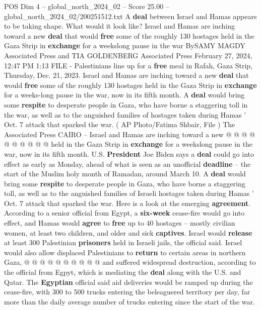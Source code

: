 \begin{textsample}{POS Dim 4 – global\_north\_2024\_02 – Score 25.00 – global\_north\_2024\_02/200251512.txt}  \label{ex:f4_pos_174}
A \textbf{deal} between Israel and Hamas appears to be taking shape.
What would it look like?
Israel and Hamas are inching toward a new \textbf{deal} that would \textbf{free} some of the roughly 130 hostages held in the Gaza Strip in \textbf{exchange} for a weekslong pause in the war BySAMY MAGDY Associated Press and TIA GOLDENBERG Associated Press February 27, 2024, 12:47 PM 1:13 FILE - Palestinians line up for a \textbf{free} meal in Rafah, Gaza Strip, Thursday, Dec. 21, 2023.
Israel and Hamas are inching toward a new \textbf{deal} that would \textbf{free} some of the roughly 130 hostages held in the Gaza Strip in \textbf{exchange} for a weeks-long pause in the war, now in its fifth month.
A \textbf{deal} would bring some \textbf{respite} to desperate people in Gaza, who have borne a staggering toll in the war, as well as to the anguished families of hostages taken during Hamas ' Oct. 7 attack that sparked the war. ( AP Photo/Fatima Shbair, File ) The Associated Press CAIRO -- Israel and Hamas are inching toward a new @ @ @ @ @ @ @ @ @ @ held in the Gaza Strip in \textbf{exchange} for a weekslong pause in the war, now in its fifth month.
U.S. \textbf{President} Joe Biden says a \textbf{deal} could go into effect as early as Monday, ahead of what is seen as an unofficial \textbf{deadline} -- the start of the Muslim holy month of Ramadan, around March 10.
A \textbf{deal} would bring some \textbf{respite} to desperate people in Gaza, who have borne a staggering toll, as well as to the anguished families of Israeli hostages taken during Hamas ' Oct. 7 attack that sparked the war.
Here is a look at the emerging \textbf{agreement}.
According to a senior official from Egypt, a \textbf{six-week} cease-fire would go into effect, and Hamas would \textbf{agree} to \textbf{free} up to 40 hostages -- mostly civilian women, at least two children, and older and sick \textbf{captives}.
Israel would \textbf{release} at least 300 Palestinian \textbf{prisoners} held in Israeli jails, the official said.
Israel would also allow displaced Palestinians to \textbf{return} to certain areas in northern Gaza, @ @ @ @ @ @ @ @ @ @ and suffered widespread destruction, according to the official from Egpyt, which is mediating the \textbf{deal} along with the U.S. and Qatar.
The \textbf{Egyptian} official said aid deliveries would be ramped up during the cease-fire, with 300 to 500 trucks entering the beleaguered territory per day, far more than the daily average number of trucks entering since the start of the war.

\end{textsample}
